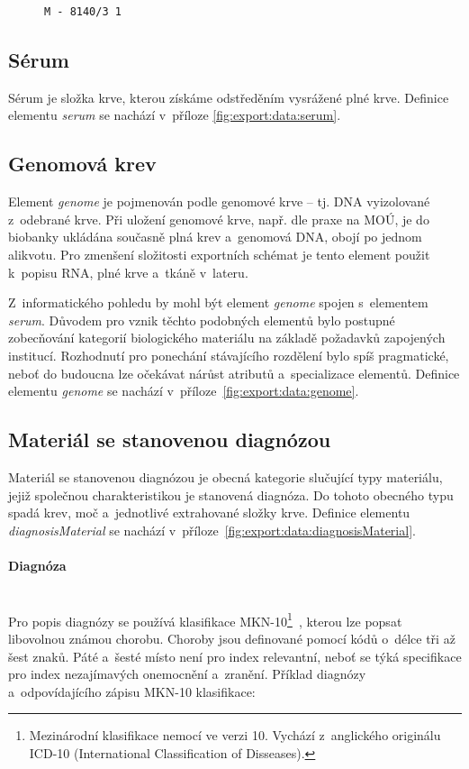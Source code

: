\documentclass[11pt, draft, oneside]{fithesis2}
\newcommand{\paragraphNewLine}[1]{\paragraph*{#1}\mbox{}\\}
\begin{document}
\begin{figure}[h!] %
\centering
\begin{BVerbatim}
M - 8140/3 1
\end{BVerbatim}
\end{figure}

\subsection{Sérum}
Sérum je složka krve, kterou získáme odstředěním vysrážené plné krve. Definice elementu \textit{serum} se nachází v~příloze \ref{fig:export:data:serum}.

\subsection{Genomová krev}
Element \textit{genome} je pojmenován podle genomové krve -- tj. DNA vyizolované z~odebrané krve. Při uložení genomové krve, např. dle praxe na MOÚ, je do biobanky ukládána současně plná krev a~genomová DNA, obojí po jednom alikvotu.
Pro zmenšení složitosti exportních schémat je tento element použit k~popisu RNA, plné krve a~tkáně v~lateru.

Z~informatického pohledu by mohl být element \textit{genome} spojen s~elementem \textit{serum}. Důvodem pro vznik těchto podobných elementů bylo postupné zobecňování kategorií biologického materiálu na základě požadavků zapojených institucí. Rozhodnutí pro ponechání stávajícího rozdělení bylo spíš pragmatické, neboť do budoucna lze očekávat nárůst atributů a~specializace elementů. Definice elementu \textit{genome} se nachází v~příloze~\ref{fig:export:data:genome}.

\subsection{Materiál se stanovenou diagnózou}
Materiál se stanovenou diagnózou je obecná kategorie slučující typy materiálu, jejiž společnou charakteristikou je stanovená diagnóza. Do tohoto obecného typu spadá krev, moč a~jednotlivé extrahované složky krve.
Definice elementu \textit{diagnosisMaterial} se nachází v~příloze~\ref{fig:export:data:diagnosisMaterial}.

\paragraphNewLine{Diagnóza}
Pro popis diagnózy se používá klasifikace MKN-10\footnote{Mezinárodní klasifikace nemocí ve verzi 10. Vychází z~anglického originálu ICD-10 (International Classification of Disseases).}~\cite{MKN-10}, kterou lze popsat libovolnou známou chorobu.
Choroby jsou definované pomocí kódů o~délce tři až šest znaků. Páté a~šesté místo není pro index relevantní, neboť se týká specifikace pro index nezajímavých onemocnění a~zranění. 
Příklad diagnózy a~odpovídajícího zápisu MKN-10 klasifikace:
\end{document}
